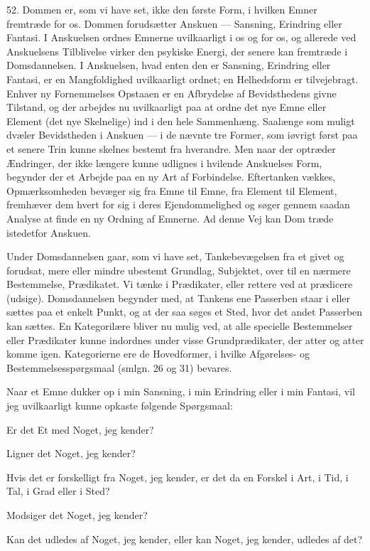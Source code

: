 \documentclass[12pt,a4paper]{book}
\newcommand{\apage}[1]{\marginnote{\footnotesize\textit{[#1]}}}
\begin{document}
52. Dommen er, som vi have set, ikke den første Form, i hvilken Emner
fremtræde for os. Dommen forudsætter Anskuen --- Sansning, Erindring
eller Fantasi. I Anskuelsen ordnes Emnerne uvilkaarligt i os og for os,
og allerede ved \apage{137} Anskuelsens Tilblivelse virker den psykiske Energi, der
senere kan fremtræde i Domsdannelsen. I Anskuelsen, hvad enten den er
Sansning, Erindring eller Fantasi, er en Mangfoldighed uvilkaarligt
ordnet; en Helhedsform er tilvejebragt. Enhver ny Fornemmelses Opstaaen
er en Afbrydelse af Bevidsthedens givne Tilstand, og der arbejdes nu
uvilkaarligt paa at ordne det nye Emne eller Element (det nye Skelnelige)
ind i den hele Sammenhæng. Saalænge som muligt dvæler Bevidstheden i
Anskuen --- i de nævnte tre Former, som iøvrigt først paa et senere Trin
kunne skelnes bestemt fra hverandre. Men naar der optræder Ændringer, der
ikke længere kunne udlignes i hvilende Anskuelses Form, begynder der et
Arbejde paa en ny Art af Forbindelse. Eftertanken vækkes,
Opmærksomheden bevæger sig fra Emne til Emne, fra Element til Element,
fremhæver dem hvert for sig i deres Ejendommelighed og søger gennem
saadan Analyse at finde en ny Ordning af Emnerne. Ad denne Vej kan Dom
træde istedetfor Anskuen.

Under Domsdannelsen gaar, som vi have set, Tankebevægelsen fra et givet
og forudsat, mere eller mindre ubestemt Grundlag, Subjektet, over til en nærmere Bestemmelse, Prædikatet. Vi tænke i Prædikater, eller
rettere ved at prædicere (udsige). Domsdannelsen begynder med, at Tankens
ene Passerben staar i eller sættes paa et enkelt Punkt, og at der saa
søges et Sted, hvor det andet Passerben kan sættes. En Kategorilære bliver nu mulig ved, at alle specielle Bestemmelser eller Prædikater kunne
indordnes under visse Grundprædikater, der atter og atter komme igen.
Kategorierne ere de Hovedformer, i hvilke Afgørelses- og
Bestemmelsesspørgsmaal (smlgn. 26 og 31) bevares.

Naar et Emne dukker op i min Sansning, i min Erindring eller i min
Fantasi, vil jeg uvilkaarligt kunne opkaste følgende Spørgsmaal:

Er det Et med Noget, jeg kender?

Ligner det Noget, jeg kender?

Hvis det er forskelligt fra Noget, jeg kender, er det da en Forskel i
Art, i Tid, i Tal, i Grad eller i Sted?

\apage{138} Modsiger det Noget, jeg kender?

Kan det udledes af Noget, jeg kender, eller kan Noget, jeg kender, udledes
af det?
\end{document}
